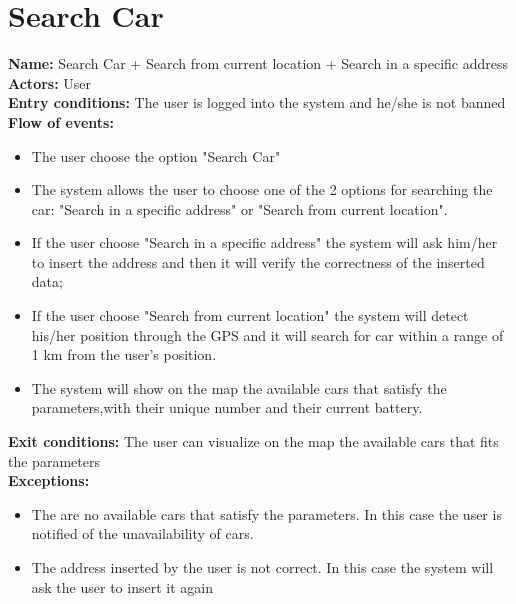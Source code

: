 \section*{Search Car}
\textbf{Name:} Search Car + Search from current location + Search in a specific address\\
\textbf{Actors:} User\\
\textbf{Entry conditions:} The user is logged into the system and he/she is not banned\\
\textbf{Flow of events:}
\begin{itemize}
\item The user choose the option "Search Car"
\item The system allows the user to choose one of the 2 options for searching the car: "Search in a specific address" or "Search from current location".
\item If the user choose "Search in a specific address" the system will ask him/her to insert the address and then it will verify the correctness of the inserted data;
\item If the user choose "Search from current location" the system will detect his/her position through the GPS and it will search for car within a range of 1 km from the user's position.
\item The system will show on the map the available cars that satisfy the parameters,with their unique number and their current battery.
\end{itemize}
\textbf{Exit conditions:} The user can visualize on the map the available cars that fits the parameters \\
\textbf{Exceptions:}  
\begin{itemize}
\item The are no available cars that satisfy the parameters. In this case the user is notified of the unavailability of cars.
\item The address inserted by the user is not correct. In this case the system will ask the user to insert it again
\end{itemize}

